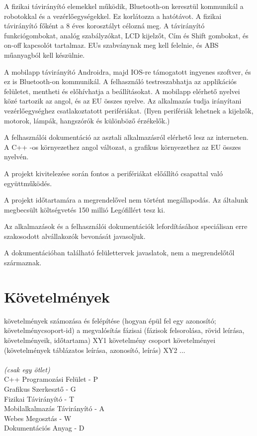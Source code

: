 \documentclass{article}
\begin{document}
A fizikai távirányító elemekkel működik, Bluetooth-on keresztül kommunikál a robotokkal és a vezérlőegységekkel. Ez korlátozza a hatótávot. A fizikai távirányító főként a 8 éves korosztályt célozná meg. A távirányító funkciógombokat, analóg szabályzókat, LCD kijelzőt, Cím és Shift gombokat,  és on-off kapcsolót tartalmaz. EUs szabványnak meg kell felelnie, és ABS műanyagból kell készülnie.
\newline

A mobilapp távirányító Androidra, majd IOS-re támogatott ingyenes szoftver, és ez is Bluetooth-on kommunikál. A felhasználó testreszabhatja az applikációs felületet, mentheti és előhívhatja a beállításokat. A mobilapp elérhető nyelvei közé tartozik az angol, és az EU összes nyelve. Az alkalmazás tudja irányítani vezérlőegységhez csatlakoztatott perifériákat. (Ilyen perifériák lehetnek a kijelzők, motorok, lámpák, hangszórók és különböző érzékelők.)
\newline

A felhasználói dokumentáció az asztali alkalmazásról elérhető lesz az interneten. A C++ -os környezethez angol változat, a grafikus környezethez az EU összes nyelvén.
\newline

A projekt kivitelezése során fontos a perifériákat előállító csapattal való együttműködés.
\newline

A projekt időtartamára a megrendelővel nem történt megállapodás. 
Az általunk megbecsült költségvetés 150 millió Legófillért tesz ki.
\newline

Az alkalmazások és a felhasználói dokumentációk lefordításához speciálisan erre szakosodott alvállakozók bevonását javasoljuk. 
\newline

A dokumentációban található felülettervek javaslatok, nem a megrendelőtől származnak.


\pagebreak
\section{Követelmények}

követelmények számozása és felépítése (hogyan épül fel egy azonosító; követelménycsoport-id)
a megvalósítás fázisai (fázisok felsorolása, rövid leírása, követelményeik, időtartama) 
XY1 követelmény csoport követelményei (követelmények táblázatos leírása, azonosító, leírás)
XY2 ... \\
\\
\textit{(csak egy ötlet)} \\
C++ Programozási Felület - P \\
Grafikus Szerkesztő - G \\
Fizikai Távirányító - T \\
Mobilalkalmazás Távirányító - A \\
Webes Megosztás - W \\
Dokumentációs Anyag - D \\
\end{document}
